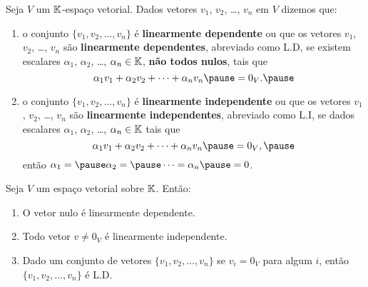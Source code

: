 \documentclass{beamer}
\begin{document}
\begin{frame}
  \begin{definicao}
    Seja $V$ um $\mathbb{K}$-espaço vetorial. \pause Dados vetores $v_1$, $v_2$, \dots, $v_n$ \pause em $V$ dizemos que:\pause
    \begin{enumerate}[label={\roman*})]
      \item o conjunto $\{v_1, v_2, \dots, v_n\}$ \pause é \textbf{linearmente dependente} \pause ou que os vetores $v_1$, $v_2$, \dots, $v_n$ são \textbf{linearmente dependentes}, \pause abreviado como L.D, \pause se existem escalares
        $\alpha_1$, $\alpha_2$, \dots, $\alpha_n \in \mathbb{K}$, \pause \textbf{não todos nulos}, \pause tais que\pause
        \[
            \alpha_1v_1 + \alpha_2v_2 + \cdots + \alpha_nv_n \pause = 0_V.\pause
        \]

      \item o conjunto $\{v_1, v_2, \dots, v_n\}$ \pause é \textbf{linearmente independente} \pause ou que os vetores $v_1$, $v_2$, \dots, $v_n$ são \textbf{linearmente independentes}, \pause abreviado como L.I, \pause se dados escalares
        $\alpha_1$, $\alpha_2$, \dots, $\alpha_n \in \mathbb{K}$  tais que\pause
        \[
            \alpha_1v_1 + \alpha_2v_2 + \cdots + \alpha_nv_n \pause = 0_V,\pause
        \]
        então $\alpha_1 = \pause \alpha_2 = \pause \cdots = \alpha_n \pause = 0$.
    \end{enumerate}
  \end{definicao}
\end{frame}


\begin{frame}
  \begin{proposicao}
  Seja $V$ um espaço vetorial sobre $\mathbb{K}$. Então:\pause

  \begin{enumerate}[label={\roman*})]
    \item O vetor nulo é linearmente dependente.\pause

    \vspace{.3cm}
    
    \item Todo vetor $v \ne 0_V$ \pause é linearmente independente.\pause
    
    \vspace{.3cm}

    \item Dado um conjunto de vetores $\{v_1, v_2, \dots, v_n\}$ \pause se $v_i = 0_V$ para algum $i$, \pause então $\{v_1, v_2, \dots, v_n\}$ é L.D.

    \seti
  \end{enumerate}
  \end{proposicao}
\end{frame}
\end{document}
